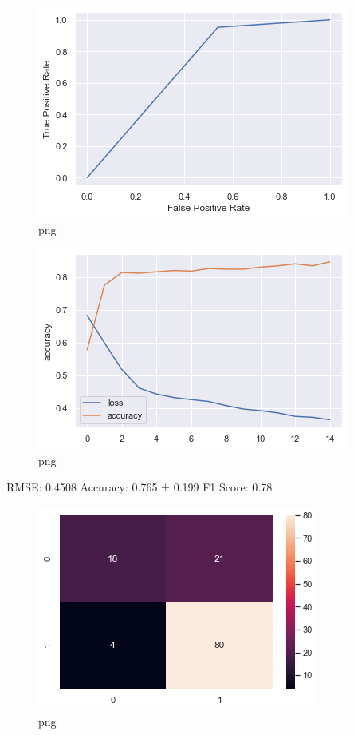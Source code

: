 \documentclass[]{article}
\begin{document}
\begin{figure}
\centering
\includegraphics{notebook_files/notebook_60_0.png}
\caption{png}
\end{figure}

\begin{figure}
\centering
\includegraphics{notebook_files/notebook_60_1.png}
\caption{png}
\end{figure}

RMSE: 0.4508 Accuracy: 0.765 ± 0.199 F1 Score: 0.78

\begin{figure}
\centering
\includegraphics{notebook_files/notebook_60_3.png}
\caption{png}
\end{figure}
\end{document}
